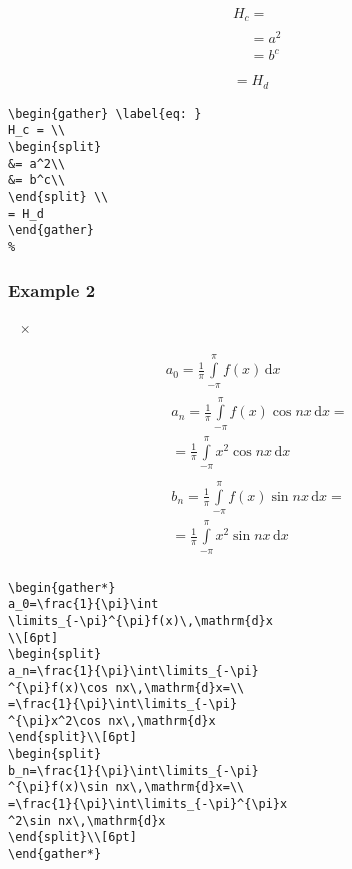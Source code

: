 \documentclass[journal]{IEEEtran}
\begin{document}
\begin{gather}
H_c = \\
\begin{split}
&= a^2\\
&= b^c\\
\end{split}\\
= H_d
\end{gather}

\begin{verbatim}
\begin{gather} \label{eq: }
H_c = \\
\begin{split}
&= a^2\\
&= b^c\\
\end{split} \\
= H_d
\end{gather}
%
\end{verbatim}


\subsubsection{Example 2}~{\color{red} \Large $\mathbf{\times}$}

\begin{gather*}
a_0=\frac{1}{\pi}\int\limits_{-\pi}^{\pi}f(x)\,\mathrm{d}x\\[6pt]
\begin{split}
a_n=\frac{1}{\pi}\int\limits_{-\pi}^{\pi}f(x)\cos nx\,\mathrm{d}x=\\
=\frac{1}{\pi}\int\limits_{-\pi}^{\pi}x^2\cos nx\,\mathrm{d}x
\end{split}\\[6pt]
\begin{split}
b_n=\frac{1}{\pi}\int\limits_{-\pi}^{\pi}f(x)\sin nx\,\mathrm{d}x=\\
=\frac{1}{\pi}\int\limits_{-\pi}^{\pi}x^2\sin nx\,\mathrm{d}x
\end{split}\\[6pt]
\end{gather*}

\begin{verbatim}
\begin{gather*}
a_0=\frac{1}{\pi}\int
\limits_{-\pi}^{\pi}f(x)\,\mathrm{d}x
\\[6pt]
\begin{split}
a_n=\frac{1}{\pi}\int\limits_{-\pi}
^{\pi}f(x)\cos nx\,\mathrm{d}x=\\
=\frac{1}{\pi}\int\limits_{-\pi}
^{\pi}x^2\cos nx\,\mathrm{d}x
\end{split}\\[6pt]
\begin{split}
b_n=\frac{1}{\pi}\int\limits_{-\pi}
^{\pi}f(x)\sin nx\,\mathrm{d}x=\\
=\frac{1}{\pi}\int\limits_{-\pi}^{\pi}x
^2\sin nx\,\mathrm{d}x
\end{split}\\[6pt]
\end{gather*}
\end{verbatim}
\end{document}
